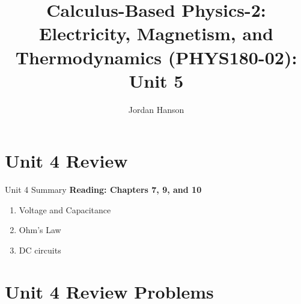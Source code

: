 \documentclass{beamer}
\title{Calculus-Based Physics-2: Electricity, Magnetism, and Thermodynamics (PHYS180-02): Unit 5}
\author{Jordan Hanson}
\institute{Whittier College Department of Physics and Astronomy}
\begin{document}
\maketitle

\section{Unit 4 Review}

\begin{frame}{Unit 4 Summary}
\textbf{Reading: Chapters 7, 9, and 10}
\begin{enumerate}
\item \alert{Voltage and Capacitance}
\item Ohm's Law
\item DC circuits
\end{enumerate}
\end{frame}

\section{Unit 4 Review Problems}
\end{document}
